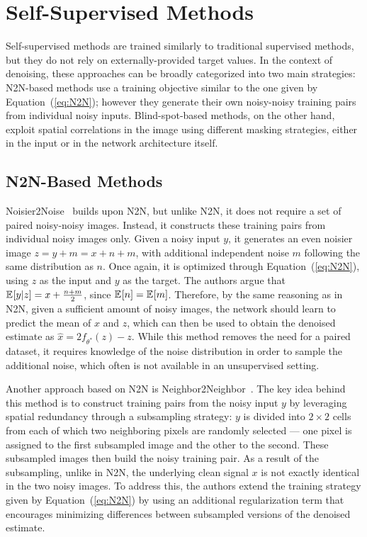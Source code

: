 \section{Self-Supervised Methods}\label{sec:self-supervised}

Self-supervised methods are trained similarly to traditional supervised methods, but they do not rely on externally-provided target values.
In the context of denoising, these approaches can be broadly categorized into two main strategies:
N2N-based methods use a training objective similar to the one given by Equation~(\ref{eq:N2N}); however they generate their own noisy-noisy training pairs from individual noisy inputs.
Blind-spot-based methods, on the other hand, exploit spatial correlations in the image using different masking strategies, either in the input or in the network architecture itself.

\subsection{N2N-Based Methods}

Noisier2Noise~\cite{Noisier2Noise} builds upon N2N, but unlike N2N, it does not require a set of paired noisy-noisy images.
Instead, it constructs these training pairs from individual noisy images only.
Given a noisy input $y$, it generates an even noisier image $z = y + m = x + n + m$, with additional independent noise $m$ following the same distribution as $n$.
Once again, it is optimized through Equation~(\ref{eq:N2N}), using $z$ as the input and $y$ as the target.
The authors argue that $\mathbb{E}_{ } [y|z] = x + \frac{n + m}{2}$, since $\mathbb{E}_{ } [n] = \mathbb{E}_{ } [m]$.  %
Therefore, by the same reasoning as in N2N, given a sufficient amount of noisy images, the network should learn to predict the mean of $x$ and $z$, which can then be used to obtain the denoised estimate as $\hat{x} = 2f_{\theta^*}(z) - z$.
While this method removes the need for a paired dataset, it requires knowledge of the noise distribution in order to sample the additional noise, which often is not available in an unsupervised setting.

Another approach based on N2N is Neighbor2Neighbor~\cite{Neighbor2Neighbor}.
The key idea behind this method is to construct training pairs from the noisy input $y$ by leveraging spatial redundancy through a subsampling strategy:
$y$ is divided into $2 \times 2$ cells from each of which two neighboring pixels are randomly selected --- one pixel is assigned to the first subsampled image and the other to the second.
These subsampled images then build the noisy training pair.
As a result of the subsampling, unlike in N2N, the underlying clean signal $x$ is not exactly identical in the two noisy images.
To address this, the authors extend the training strategy given by Equation~(\ref{eq:N2N}) by using an additional regularization term that encourages minimizing differences between subsampled versions of the denoised estimate.

